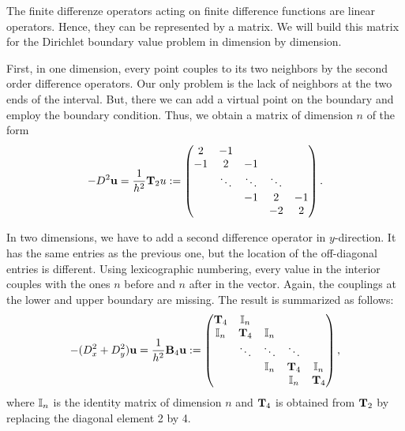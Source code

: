 \begin{remark}
  The finite differenze operators acting on finite difference
  functions are linear operators. Hence, they can be represented by a
  matrix. We will build this matrix for the Dirichlet boundary value
  problem in  dimension by
  dimension.

  First, in one dimension, every point couples to its two neighbors by
  the second order difference operators. Our only problem is the lack
  of neighbors at the two ends of the interval. But, there we can add
  a virtual point on the boundary and employ the boundary
  condition. Thus, we obtain a matrix of dimension $n$ of the form
  \begin{gather}
    -D^2 \mathbf u = \frac1{h^2} \mathbf T_2 u :=
    \begin{pmatrix}
      2 & -1 \\
      -1 & 2 & -1\\
      &\ddots & \ddots & \ddots \\
      &&-1 & 2 & -1\\
      &&& -2 & 2
    \end{pmatrix}.
  \end{gather}

  In two dimensions, we have to add a second difference operator in
  $y$-direction. It has the same entries as the previous one, but the
  location of the off-diagonal entries is different. Using
  lexicographic numbering, every value in the interior couples with
  the ones $n$ before and $n$ after in the vector. Again, the
  couplings at the lower and upper boundary are missing. The result is
  summarized as follows:
  \begin{gather}
    -(D_x^2+D_y^2) \mathbf u = \frac1{h^2} \mathbf B_4 \mathbf u :=
    \begin{pmatrix}
      \mathbf T_4 & \mathbb I_n \\
      \mathbb I_n & \mathbf T_4 & \mathbb I_n \\
      &\ddots & \ddots & \ddots \\
      &&\mathbb I_n & \mathbf T_4 & \mathbb I_n \\
      &&&\mathbb I_n & \mathbf T_4 \\
    \end{pmatrix},
  \end{gather}
  where $\mathbb I_n$ is the identity matrix of dimension $n$ and $\mathbf T_4$
  is obtained from $\mathbf T_2$ by replacing the diagonal element 2 by 4.


\end{remark}
